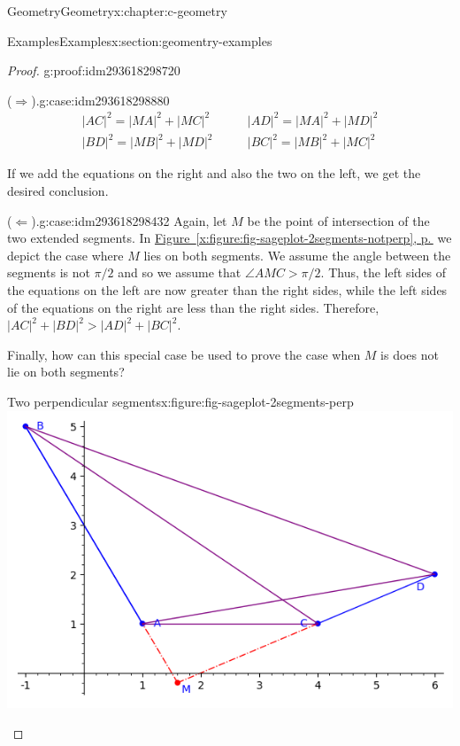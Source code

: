 \documentclass[twoside,10pt,]{book}
\newcommand{\xreffont}{\relax}
\numberwithin{equation}{section}
\newcommand{\gt}{>}
\begin{document}
\begin{chapterptx}{Geometry}{}{Geometry}{}{}{x:chapter:c-geometry}
\begin{sectionptx}{Examples}{}{Examples}{}{}{x:section:geomentry-examples}
\begin{proof}{}{g:proof:idm293618298720}
\begin{case}{}{(\(\Rightarrow\)).}{g:case:idm293618298880}
\begin{equation*}
\begin{split}
\lvert AC\rvert^2 = \lvert MA\rvert^2 +\lvert  MC\rvert^2 
\qquad &\lvert AD\rvert^2 =\lvert  MA\rvert^2 + \lvert MD\rvert^2 \\
\lvert BD\rvert^2 = \lvert MB\rvert^2 +\lvert MD\rvert^2 
\qquad &\lvert BC\rvert^2 = \lvert MB\rvert^2 + \lvert MC\rvert^2
\end{split}
\end{equation*}
%
\par
If we add the equations on the right and also the two on the left, we get the desired conclusion.%
\end{case}
\begin{case}{}{(\(\Leftarrow\)).}{g:case:idm293618298432}
Again, let \(M\) be the point of intersection of the two extended segments.  In  \hyperref[x:figure:fig-sageplot-2segments-notperp]{Figure~{\xreffont\ref{x:figure:fig-sageplot-2segments-notperp}}, p.\,\pageref{x:figure:fig-sageplot-2segments-notperp}} we depict the case where \(M\) lies on both segments.  We assume the angle between the segments is not \(\pi/2\) and so we assume that \(\angle AMC \gt \pi/2\).  Thus, the left sides of the equations on the left are now greater than the right sides, while the left sides of the equations on the right are less than the right sides.  Therefore, \(\lvert AC \rvert^2 +  \lvert BD \rvert^2 \gt \lvert AD \rvert^2 + \lvert BC \rvert^2\).%
\par
Finally, how can this special case be used to prove the case when \(M\) is does not lie on both segments?%
\end{case}
\begin{sidebyside}{2}{0}{0}{0}%
\begin{sbspanel}{0.5}%
\begin{figureptx}{Two perpendicular segments}{x:figure:fig-sageplot-2segments-perp}{}%
\includegraphics[width=\linewidth]{images/sageplot-2segments-perp.png}

\end{figureptx}
\end{sbspanel}
\end{sidebyside}
\end{proof}
\end{sectionptx}
\end{chapterptx}
\end{document}
